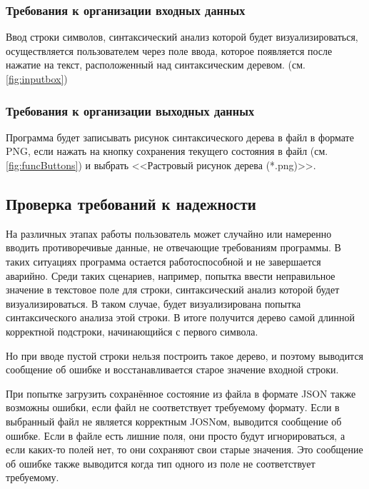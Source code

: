 \documentclass[a4paper,12pt]{article}
\begin{document}
  \subsubsection{Требования к организации входных данных}
  Ввод строки символов, синтаксический анализ которой будет визуализироваться, осуществляется пользователем через поле ввода,
  которое появляется после нажатие на текст, расположенный над синтаксическим деревом. (см. \autoref{fig:inputbox})

  \subsubsection{Требования к организации выходных данных}
  Программа будет записывать рисунок синтаксического дерева в файл в формате PNG,
  если нажать на кнопку сохранения текущего состояния в файл (см. \autoref{fig:funcButtons}) и выбрать
  <<Растровый рисунок дерева (*.png)>>. 

  \subsection{Проверка требований к надежности}
  На различных этапах работы пользователь может случайно или намеренно вводить противоречивые данные, не отвечающие требованиям программы.
  В таких ситуациях программа остается работоспособной и не завершается аварийно.
  Среди таких сценариев, например, попытка ввести неправильное значение в текстовое поле для строки,
  синтаксический анализ которой будет визуализироваться.
  В таком случае, будет визуализирована попытка синтаксического анализа этой строки.
  В итоге получится дерево самой длинной корректной подстроки, начинающийся с первого символа. 

  Но при вводе пустой строки нельзя построить такое дерево,
  и поэтому выводится сообщение об ошибке и восстанавливается старое значение входной строки. 

  При попытке загрузить сохранённое состояние из файла в формате JSON также возможны ошибки,
  если файл не соответствует требуемому формату.
  Если в выбранный файл не является корректным JOSNом, выводится сообщение об ошибке. 
  Если в файле есть лишние поля, они просто будут игнорироваться, а если каких-то полей нет, то они сохраняют свои старые значения.
  Это сообщение об ошибке также выводится когда тип одного из поле не соответствует требуемому.
\end{document}
